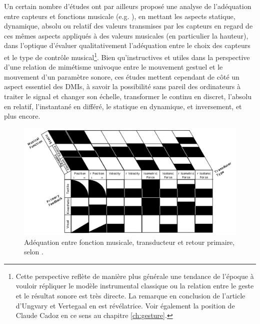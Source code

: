 \noindent Un certain nombre d'études ont par ailleurs proposé une analyse de l'adéquation entre capteurs et fonctions musicale (e.g. \cite{vertegaal_towards_1996, goudeseune_interpolated_2002}), en mettant les aspects statique, dynamique, absolu ou relatif des valeurs transmises par les capteurs en regard de ces mêmes aspects appliqués à des valeurs musicales (en particulier la hauteur), dans l'optique d'évaluer qualitativement l'adéquation entre le choix des capteurs et le type de contrôle musical\footnote{Cette perspective reflète de manière plus générale une tendance de l'époque à vouloir répliquer le modèle instrumental classique ou la relation entre le geste et le résultat sonore est très directe. La remarque en conclusion de l'article d'Ungvary et Vertegaal  en est révélatrice. Voir également la position de Claude Cadoz en ce sens au chapitre \ref{ch:gesture}.}. Bien qu'instructives et utiles dans la perspective d'une relation de mimétisme univoque entre le mouvement gestuel et le mouvement d'un paramètre sonore, ces études mettent cependant de côté un aspect essentiel des \glspl{DMI}, à savoir la possibilité sans pareil des ordinateurs à traiter le signal et changer son échelle, transformer le continu en discret, l'absolu en relatif, l'instantané en différé, le statique en dynamique, et inversement, et plus encore.\\
\begin{figure}[!htbp]
	\captionsetup{format=plain}%
	\includegraphics[width=\textwidth]{gfx/05_interfaces/vertegaal-musical-function.png}
	\caption[Adéquation entre fonction musicale, transducteur et retour primaire]{Adéquation entre fonction musicale, transducteur et retour primaire, selon \cite{vertegaal_towards_1996}.}
	\label{fig:interface:vertegaal-transducer-function}
\end{figure}
